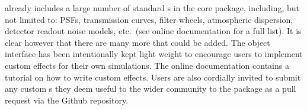 \ScopeSim{} already includes a large number of standard \Effect{}s in
the core package, including, but not limited to: PSFs, transmission
curves, filter wheels, atmospheric dispersion, detector readout noise
models, etc.\ (see online documentation for a full list).  It is clear
however that there are many more that could be added.  The \Effect{}
object interface has been intentionally kept light weight to encourage
users to implement custom effects for their own simulations.  The
online documentation contains a tutorial on how to write custom
effects.  Users are also cordially invited to submit any custom
\Effect{}s they deem useful to the wider community to the \ScopeSim{}
package as a pull request via the Github repository.

